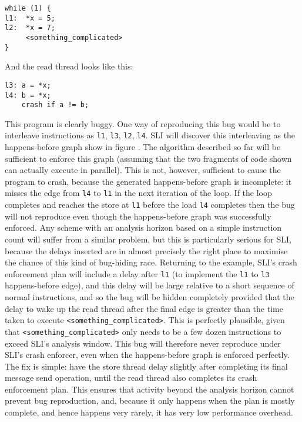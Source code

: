 \begin{verbatim}
while (1) {
l1:  *x = 5;
l2:  *x = 7;
     <something_complicated>
}
\end{verbatim}

And the read thread looks like this:

\begin{verbatim}
l3: a = *x;
l4: b = *x;
    crash if a != b;
\end{verbatim}

This program is clearly buggy.
One way of reproducing this bug would be to interleave instructions as \verb|l1|, \verb|l3|, \verb|l2|, \verb|l4|.
SLI will discover this interleaving as the happens-before graph show in figure .
The algorithm described so far will be sufficient to enforce this graph (assuming that the two fragments of code shown can actually execute in parallel).
This is not, however, sufficient to cause the program to crash, because the generated happens-before graph is incomplete: it misses the edge from \verb|l4| to \verb|l1| in the next iteration of the loop.
If the loop completes and reaches the store at \verb|l1| before the load \verb|l4| completes then the bug will not reproduce even though the happens-before graph was successfully enforced.
Any scheme with an analysis horizon based on a simple instruction count will suffer from a similar problem, but this is particularly serious for SLI, because the delays inserted are in almost precisely the right place to maximise the chance of this kind of bug-hiding race.
Returning to the example, SLI's crash enforcement plan will include a delay after \verb|l1| (to implement the \verb|l1| to \verb|l3| happens-before edge), and this delay will be large relative to a short sequence of normal instructions, and so the bug will be hidden completely provided that the delay to wake up the read thread after the final edge is greater than the time taken to execute \verb|<something_complicated>|.
This is perfectly plausible, given that \verb|<something_complicated>| only needs to be a few dozen instructions to exceed SLI's analysis window.
This bug will therefore never reproduce under SLI's crash enforcer, even when the happens-before graph is enforced perfectly.
The fix is simple: have the store thread delay slightly after completing its final message send operation, until the read thread also completes its crash enforcement plan.
This ensures that activity beyond the analysis horizon cannot prevent bug reproduction, and, because it only happens when the plan is mostly complete, and hence happens very rarely, it has very low performance overhead.

